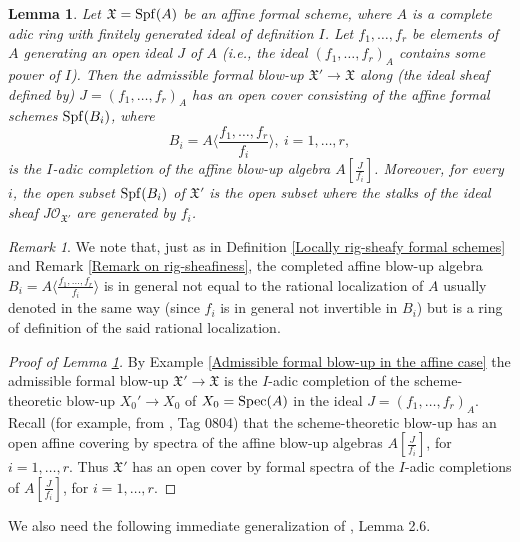\documentclass[12pt,twoside,a4paper]{article}
\newtheorem{lemma}[thm]{Lemma}
\theoremstyle{definition}
\theoremstyle{remark}
\newtheorem{rmk}[thm]{Remark}
\newcommand\Spec{{\rm Spec}}
\newcommand\Spf{{\rm Spf}}
\begin{document}
\begin{lemma}\label{Local explicit description}Let $\mathfrak{X}=\Spf(A)$ be an affine formal scheme, where $A$ is a complete adic ring with finitely generated ideal of definition $I$. Let $f_1,\dots, f_r$ be elements of $A$ generating an open ideal $J$ of $A$ (i.e., the ideal $(f_1,\dots, f_r)_{A}$ contains some power of $I$). Then the admissible formal blow-up $\mathfrak{X}'\to \mathfrak{X}$ along (the ideal sheaf defined by) $J=(f_1,\dots, f_{r})_{A}$ has an open cover consisting of the affine formal schemes $\Spf(B_{i})$, where\begin{equation*}B_{i}=A\langle \frac{f_1,\dots, f_r}{f_i}\rangle, \ i=1,\dots, r,\end{equation*}is the $I$-adic completion of the affine blow-up algebra $A[\frac{J}{f_{i}}]$. Moreover, for every $i$, the open subset $\Spf(B_{i})$ of $\mathfrak{X}'$ is the open subset where the stalks of the ideal sheaf $J\mathcal{O}_{\mathfrak{X}'}$ are generated by $f_i$.\end{lemma}
\begin{rmk}\label{Remark on affine blow-up algebra}We note that, just as in Definition \ref{Locally rig-sheafy formal schemes} and Remark \ref{Remark on rig-sheafiness}, the completed affine blow-up algebra $B_{i}=A\langle\frac{f_1,\dots,f_r}{f_{i}}\rangle$ is in general not equal to the rational localization of $A$ usually denoted in the same way (since $f_{i}$ is in general not invertible in $B_{i}$) but is a ring of definition of the said rational localization.\end{rmk} 
\begin{proof}[Proof of Lemma \ref{Local explicit description}] By Example \ref{Admissible formal blow-up in the affine case} the admissible formal blow-up $\mathfrak{X}'\to \mathfrak{X}$ is the $I$-adic completion of the scheme-theoretic blow-up $X_{0}'\to X_{0}$ of $X_{0}=\Spec(A)$ in the ideal $J=(f_1,\dots, f_r)_{A}$. Recall (for example, from \cite{Stacks}, Tag 0804) that the scheme-theoretic blow-up has an open affine covering by spectra of the affine blow-up algebras $A[\frac{J}{f_{i}}]$, for $i=1,\dots, r$. Thus $\mathfrak{X}'$ has an open cover by formal spectra of the $I$-adic completions of $A[\frac{J}{f_{i}}]$, for $i=1,\dots, r$.\end{proof}
We also need the following immediate generalization of \cite{BL1}, Lemma 2.6.
\end{document}
